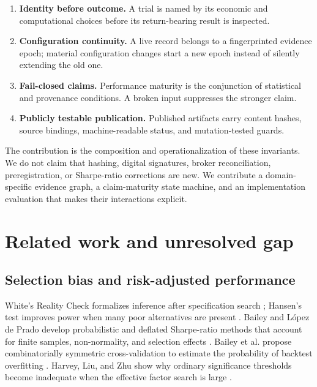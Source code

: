 \documentclass[11pt]{article}
\begin{document}
\begin{enumerate}
  \item \textbf{Identity before outcome.} A trial is named by its economic and computational choices before its return-bearing result is inspected.
  \item \textbf{Configuration continuity.} A live record belongs to a fingerprinted evidence epoch; material configuration changes start a new epoch instead of silently extending the old one.
  \item \textbf{Fail-closed claims.} Performance maturity is the conjunction of statistical and provenance conditions. A broken input suppresses the stronger claim.
  \item \textbf{Publicly testable publication.} Published artifacts carry content hashes, source bindings, machine-readable status, and mutation-tested guards.
\end{enumerate}

The contribution is the composition and operationalization of these invariants. We do not claim that hashing, digital signatures, broker reconciliation, preregistration, or Sharpe-ratio corrections are new. We contribute a domain-specific evidence graph, a claim-maturity state machine, and an implementation evaluation that makes their interactions explicit.

\section{Related work and unresolved gap}

\subsection{Selection bias and risk-adjusted performance}

White's Reality Check formalizes inference after specification search \cite{white2000reality}; Hansen's test improves power when many poor alternatives are present \cite{hansen2005spa}. Bailey and L\'opez de Prado develop probabilistic and deflated Sharpe-ratio methods that account for finite samples, non-normality, and selection effects \cite{bailey2012sharpe,bailey2014deflated}. Bailey et al. propose combinatorially symmetric cross-validation to estimate the probability of backtest overfitting \cite{bailey2017pbo}. Harvey, Liu, and Zhu show why ordinary significance thresholds become inadequate when the effective factor search is large \cite{harvey2016crosssection}.
\end{document}
